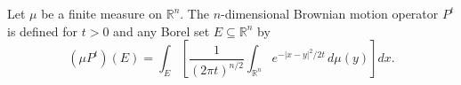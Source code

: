 Let $\mu$ be a finite measure on $\mathbb{R}^n$. The $n$-dimensional Brownian motion operator $P^t$ is defined for $t > 0$ and any Borel set $E \subseteq \mathbb{R}^n$ by
$$(\mu P^t)(E) = \int_E \left[ \frac{1}{(2\pi t)^{n/2}} \int_{\mathbb{R}^n} e^{-|x-y|^2/2t} \, d\mu(y) \right] dx.$$
